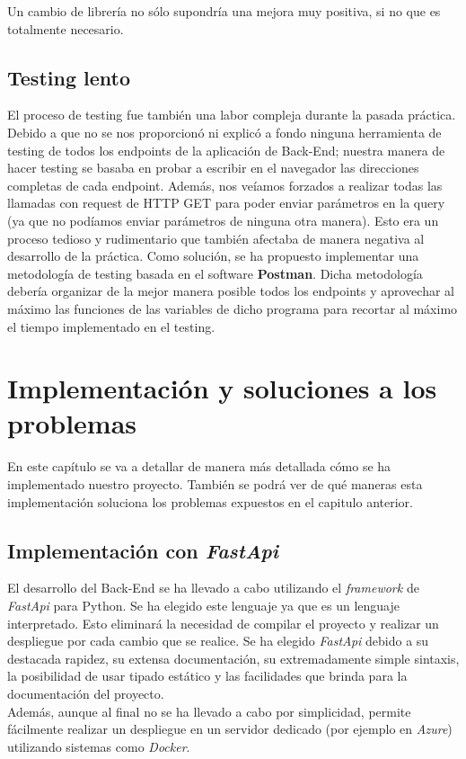 \documentclass[12pt]{report}
\begin{document}
Un cambio de librería no sólo supondría una mejora muy positiva, si no que es totalmente necesario.
\section{Testing lento}
El proceso de testing fue también una labor compleja durante la pasada práctica. Debido a que no se nos proporcionó ni explicó a fondo ninguna herramienta de testing de todos los endpoints de la aplicación de Back-End; nuestra manera de hacer testing se basaba en probar a escribir en el navegador las direcciones completas de cada endpoint. Además, nos veíamos forzados a realizar todas las llamadas con request de HTTP GET para poder enviar parámetros en la query (ya que no podíamos enviar parámetros de ninguna otra manera). Esto era un proceso tedioso y rudimentario que también afectaba de manera negativa al desarrollo de la práctica.
Como solución, se ha propuesto implementar una metodología de testing basada en el software \textbf{Postman}. Dicha metodología debería organizar de la mejor manera posible todos los endpoints y aprovechar al máximo las funciones de las variables de dicho programa para recortar al máximo el tiempo implementado en el testing.

\chapter{Implementación y soluciones a los problemas}
En este capítulo se va a detallar de manera más detallada cómo se ha implementado nuestro proyecto. También se podrá ver de qué maneras esta implementación soluciona los problemas expuestos en el capitulo anterior. 

\section{Implementación con \textit{FastApi}}
El desarrollo del Back-End se ha llevado a cabo utilizando el \textit{framework} de \textit{FastApi} para Python. Se ha elegido este lenguaje ya que es un lenguaje interpretado. Esto eliminará la necesidad de compilar el proyecto y realizar un despliegue por cada cambio que se realice.
Se ha elegido \textit{FastApi} debido a su destacada rapidez, su extensa documentación, su extremadamente simple sintaxis, la posibilidad de usar tipado estático y las facilidades que brinda para la documentación del proyecto.\\
Además, aunque al final no se ha llevado a cabo por simplicidad, permite fácilmente realizar un despliegue en un servidor dedicado (por ejemplo en \textit{Azure}) utilizando sistemas como \textit{Docker}.
\end{document}
